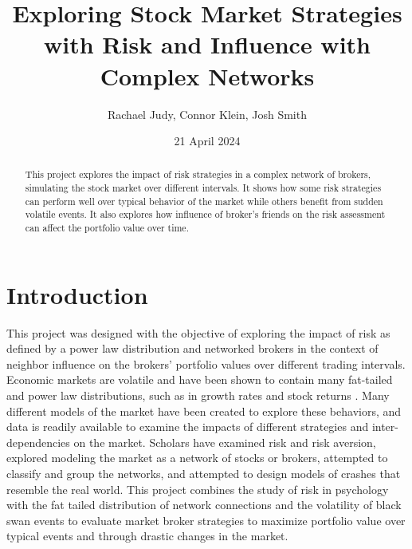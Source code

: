 \documentclass[letterpaper, 10 pt, proceedings]{ieeetran}
\title{Exploring Stock Market Strategies with Risk and Influence with Complex Networks}
\author{Rachael Judy, Connor Klein, Josh Smith}
\date{21 April 2024}
\begin{document}
	\pgfplotsset{compat=1.18}
	
	\maketitle

	\begin{abstract}
		This project explores the impact of risk strategies in a complex network of brokers, simulating the stock market over different intervals. It shows how some risk strategies can perform well over typical behavior of the market while others benefit from sudden volatile events. It also explores how influence of broker's friends on the risk assessment can affect the portfolio value over time. 
	\end{abstract}


	\section{Introduction}\label{sec:intro}
	This project was designed with the objective of exploring the impact of risk as defined by a power law distribution and networked brokers in the context of neighbor influence on the brokers' portfolio values over different trading intervals. Economic markets are volatile and have been shown to contain many fat-tailed and power law distributions, such as in growth rates and stock returns \cite{gabaix_powerlaws}. Many different models of the market have been created to explore these behaviors, and data is readily available to examine the impacts of different strategies and inter-dependencies on the market. Scholars have examined risk and risk aversion, explored modeling the market as a network of stocks or brokers, attempted to classify and group the networks, and attempted to design models of crashes that resemble the real world. This project combines the study of risk in psychology with the fat tailed distribution of network connections and the volatility of black swan \cite{taleb_antifragile} events to evaluate market broker strategies to maximize portfolio value over typical events and through drastic changes in the market.
	
\end{document}
